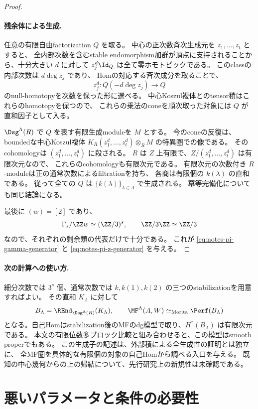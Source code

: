 \begin{proof}
\paragraph{残余体による生成.}
任意の有限自由factorization \(Q\) を取る。
中心の正次数斉次生成元を \(z_1,\ldots,z_t\) とすると、
全内部次数を含むstable endomorphism加群が頂点に支持されることから、十分大きい \(d\) に対して
\(z_j^d\Id_Q\) は全て零ホモトピックである。
このclassの内部次数は \(d\deg z_j\) であり、
Homの対応する斉次成分を取ることで、
\[
 z_j^d:Q(-d\deg z_j)\longrightarrow Q
\]
のnull-homotopyを次数を保った形に選べる。
中心Koszul複体とのtensor積はこれらのhomotopyを保つので、
これらの乗法のconeを順次取った対象には \(Q\) が直和因子として入る。

\(\Dsg^\Lambda(R)\) で \(Q\) を表す有限生成moduleを \(M\) とする。
今のconeの反復は、boundedな中心Koszul複体
\(K_R(z_1^d,\ldots,z_t^d)\otimes_R M\) の特異圏での像である。
そのcohomologyは \((z_1^d,\ldots,z_t^d)\) に殺される。
\(R\) は \(Z\) 上有限で、\(Z/(z_1^d,\ldots,z_t^d)\) は有限次元なので、
これらのcohomologyも有限次元である。
有限次元の次数付き \(R\)-moduleは正の通常次数によるfiltrationを持ち、
各商は有限個の \(k(\lambda)\) の直和である。
従って全ての \(Q\) は \(\{k(\lambda)\}_{\lambda\in\Lambda}\) で生成される。
冪等完備化についても同じ結論になる。

最後に \((w)=[2]\) であり、
\[
 \Gamma_s/\ZZ w\simeq(\ZZ/3)^s,\qquad \ZZ/3\ZZ\simeq\ZZ/3
\]
なので、それぞれの剰余類の代表だけで十分である。
これが \eqref{eq:notes-pi-gamma-generator} と \eqref{eq:notes-pi-z-generator} を与える。
\end{proof}

\paragraph{次の計算への使い方.}
細分次数では \(3^s\) 個、通常次数では \(k,k(1),k(2)\) の三つのstabilizationを用意すればよい。
その直和 \(K_\Lambda\) に対して
\[
 B_\Lambda=\REnd_{\Dsg^\Lambda(R)}(K_\Lambda),\qquad
 \MF^\Lambda(A,W)\simeq_{\mathrm{Morita}}\Perf(B_\Lambda)
\]
となる。自己Homはstabilization後のMFのdg模型で取り、\(H^*(B_\Lambda)\) は有限次元である。
本文の有限位数多ブロック比較と組み合わせると、この模型はsmooth properでもある。
この生成子の記述は、外部積による全生成性の証明とは独立に、
全MF圏を具体的な有限個の対象の自己Homから調べる入口を与える。
既知の中心幾何からの上の帰結について、先行研究上の新規性は未確認である。

\section{悪いパラメータと条件の必要性}

